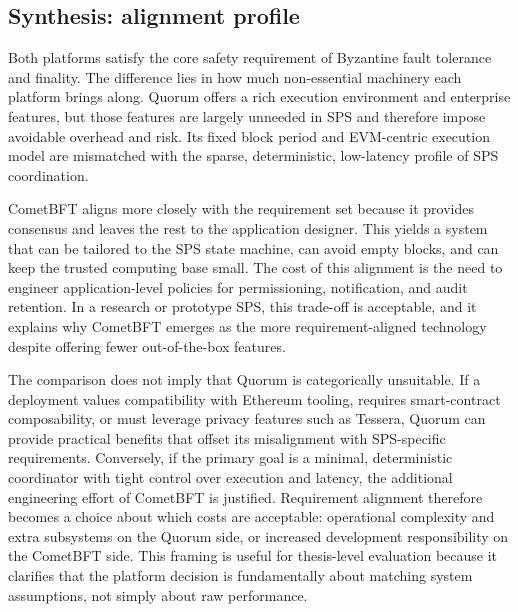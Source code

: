 \subsection{Synthesis: alignment profile}
Both platforms satisfy the core safety requirement of Byzantine fault tolerance and finality. The difference lies in how much non-essential machinery each platform brings along. Quorum offers a rich execution environment and enterprise features, but those features are largely unneeded in SPS and therefore impose avoidable overhead and risk. Its fixed block period and EVM-centric execution model are mismatched with the sparse, deterministic, low-latency profile of SPS coordination.

CometBFT aligns more closely with the requirement set because it provides consensus and leaves the rest to the application designer. This yields a system that can be tailored to the SPS state machine, can avoid empty blocks, and can keep the trusted computing base small. The cost of this alignment is the need to engineer application-level policies for permissioning, notification, and audit retention. In a research or prototype SPS, this trade-off is acceptable, and it explains why CometBFT emerges as the more requirement-aligned technology despite offering fewer out-of-the-box features.

The comparison does not imply that Quorum is categorically unsuitable. If a deployment values compatibility with Ethereum tooling, requires smart-contract composability, or must leverage privacy features such as Tessera, Quorum can provide practical benefits that offset its misalignment with SPS-specific requirements. Conversely, if the primary goal is a minimal, deterministic coordinator with tight control over execution and latency, the additional engineering effort of CometBFT is justified. Requirement alignment therefore becomes a choice about which costs are acceptable: operational complexity and extra subsystems on the Quorum side, or increased development responsibility on the CometBFT side. This framing is useful for thesis-level evaluation because it clarifies that the platform decision is fundamentally about matching system assumptions, not simply about raw performance.
